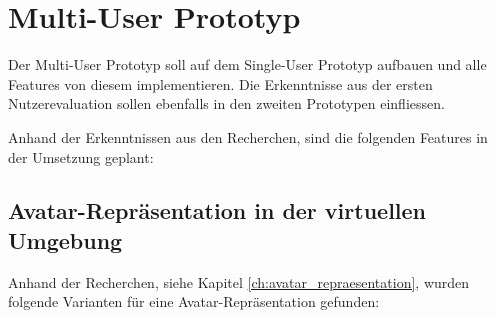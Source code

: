 
\pagebreak
\section{Multi-User Prototyp}
Der Multi-User Prototyp soll auf dem Single-User Prototyp aufbauen und alle Features von diesem implementieren. Die Erkenntnisse aus der ersten Nutzerevaluation sollen ebenfalls in den zweiten Prototypen einfliessen.

Anhand der Erkenntnissen aus den Recherchen, sind die folgenden Features in der Umsetzung geplant:

\subsection{Avatar-Repräsentation in der virtuellen Umgebung}
\label{ch:avatar_repraesentation_realisierung}
Anhand der Recherchen, siehe Kapitel \ref{ch:avatar_repraesentation}, wurden folgende Varianten für eine Avatar-Repräsentation gefunden:
